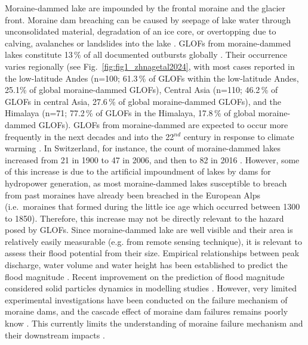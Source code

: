 Moraine-dammed lake are impounded by the frontal moraine and the glacier front. Moraine dam breaching can be caused by seepage of lake water through unconsolidated material, degradation of an ice core, or overtopping due to calving, avalanches or landslides into the lake \citep{Tweed&Russel1999,Emmer&al2022}. GLOFs from moraine-dammed lakes constitute 13\,\% of all documented outbursts globally \citep{Lutzow&al2023}. Their occurrence varies regionally (see Fig.~\ref{fig:fig1_zhnagetal2024}, with most cases reported in the low-latitude Andes (n=100; 61.3\,\% of GLOFs within the low-latitude Andes, 25.1\% of global moraine-dammed GLOFs), Central Asia (n=110; 46.2\,\% of GLOFs in central Asia, 27.6\,\% of global moraine-dammed GLOFs), and the Himalaya (n=71; 77.2\,\% of GLOFs in the Himalaya, 17.8\,\% of global moraine-dammed GLOFs). GLOFs from moraine-dammed are expected to occur more frequently in the next decades and into the 22$^{nd}$ century in response to climate warming \citep{Harrison&al2018}. In Switzerland, for instance, the count of moraine-dammed lakes increased from 21 in 1900 to 47 in 2006, and then to 82 in 2016 \citep{Zhang&al2024}. However, some of this increase is due to the artificial impoundment of lakes by dams for hydropower generation, as most moraine-dammed lakes susceptible to breach from past moraines have already been breached in the European Alps (i.e.\ moraines that formed during the little ice age which occurred between 1300 to 1850). Therefore, this increase may not be directly relevant to the hazard posed by GLOFs. %
Since moraine-dammed lake are well visible and their area is relatively easily measurable (e.g. from remote sensing technique), it is relevant to assess their flood potential from their size. Empirical relationships between peak discharge, water volume and water height has been established to predict the flood magnitude \citep[see][for a review on moraine-dammed lake failure]{Neupane&al2019}. Recent improvement on the prediction of flood magnitude considered solid particles dynamics in modelling studies \citep[e.g.][]{Mergili&al2018}. However, very limited experimental investigations have been conducted on the failure mechanism of moraine dams, and the cascade effect of moraine dam failures remains poorly know \citep{Somos-Valenzuelas&al2016}. This currently limits the understanding of moraine failure mechanism and their downstream impacts \citep{Neupane&al2019}. 

